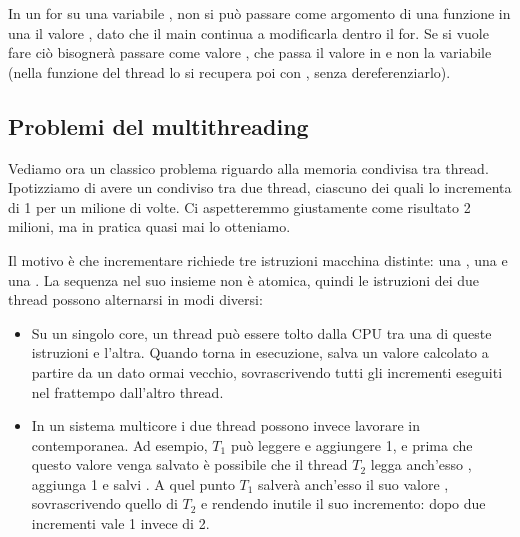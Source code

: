\documentclass[11pt, a4paper, titlepage, oneside]{scrbook}
\begin{document}
\NB In un for su una variabile , non si può passare come argomento di una funzione in una  il valore , dato che il main continua a modificarla dentro il for. Se si vuole fare ciò bisognerà passare come valore , che passa il valore in  e non la variabile (nella funzione del thread lo si recupera poi con , senza dereferenziarlo).

\subsection{Problemi del multithreading}

Vediamo ora un classico problema riguardo alla memoria condivisa tra thread. Ipotizziamo di avere un  condiviso tra due thread, ciascuno dei quali lo incrementa di 1 per un milione di volte. Ci aspetteremmo giustamente come risultato 2 milioni, ma in pratica quasi mai lo otteniamo.

Il motivo è che incrementare  richiede tre istruzioni macchina distinte: una , una  e una . La sequenza nel suo insieme non è atomica, quindi le istruzioni dei due thread possono alternarsi in modi diversi:
\begin{itemize}
    \item Su un singolo core, un thread può essere tolto dalla CPU tra una di queste istruzioni e l'altra. Quando torna in esecuzione, salva un valore calcolato a partire da un dato ormai vecchio, sovrascrivendo tutti gli incrementi eseguiti nel frattempo dall'altro thread.
    \item In un sistema multicore i due thread possono invece lavorare in contemporanea. Ad esempio, $T_1$ può leggere  e aggiungere 1, e prima che questo valore venga salvato è possibile che il thread $T_2$ legga anch'esso , aggiunga 1 e salvi \mbox{}. A quel punto $T_1$ salverà anch'esso il suo valore , sovrascrivendo quello di $T_2$ e rendendo inutile il suo incremento: dopo due incrementi  vale 1 invece di 2.
\end{itemize}
\end{document}
